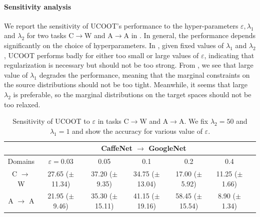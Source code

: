 \paragraph{Sensitivity analysis}
We report the sensitivity of UCOOT's performance to the hyper-parameters $\varepsilon, \lambda_1$
and $\lambda_2$ for two tasks C$\to$W and A$\to$A in
. In general,
the performance depends significantly on the choice of hyperparameters.
In , given fixed values of $\lambda_1$ and $\lambda_2$,
UCOOT performs badly for either too small or large values of $\varepsilon$,
indicating that regularization is necessary but should not be too strong.
From , we see that large value of $\lambda_1$ degrades
the performance, meaning that the marginal constraints on the source distributions should not
be too tight. Meanwhile, it seems that large $\lambda_2$ is preferable,
so the marginal distributions on the target spaces should not be too relaxed.

\hfill
\begin{table}[H]
	\begin{center}
		\begin{footnotesize}
			\begin{sc}
				\begin{tabular}{c c c c c c c}
					\toprule
					& \multicolumn{5}{c}{CaffeNet $\to$ GoogleNet} \\
					\midrule
					Domains & $\varepsilon= 0.03$ & 0.05 & 0.1 & 0.2 & 0.4 \\
					\midrule
					C $\to$ W & 27.65 ($\pm$ 11.34) & 37.20 ($\pm$ 9.35) & 34.75 ($\pm$ 13.04) & 17.00 ($\pm$ 5.92) & 11.25 ($\pm$ 1.66) \\
					\hline
					A $\to$ A & 21.95 ($\pm$ 9.46) & 35.30 ($\pm$ 15.11) & 41.15 ($\pm$ 19.16) & 58.45 ($\pm$ 15.54) & 8.90 ($\pm$ 1.34) \\
					\hline
				\end{tabular}
			\end{sc}
		\end{footnotesize}
	\end{center}
	\caption{Sensitivity of UCOOT to $\varepsilon$ in tasks C$\to$W and A$\to$A.
  We fix $\lambda_2 = 50$ and $\lambda_1 = 1$ and show the accuracy for various value of
  $\varepsilon$.} \label{tab:sensitiv_eps}
\end{table}

